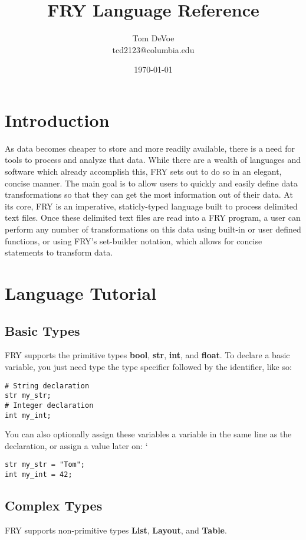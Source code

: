 \documentclass{article}
\title{FRY Language Reference}
\author{Tom DeVoe \\ tcd2123@columbia.edu}
\date{\today}
\begin{document}
\maketitle
\tableofcontents 

\section{Introduction}
As data becomes cheaper to store and more readily available, there is a need for tools to process and analyze that data. While there are a wealth of languages and software which already accomplish this, FRY sets out to do so in an elegant, concise manner. The main goal is to allow users to quickly and easily define data transformations so that they can get the most information out of their data.
At its core, FRY is an imperative, staticly-typed language built to process delimited text files. Once these delimited text files are read into a FRY program, a user can perform any number of transformations on this data using built-in or user defined functions, or using FRY's set-builder notation, which allows for concise statements to transform data. 

\section{Language Tutorial}
\subsection{Basic Types}
FRY supports the primitive types \textbf{bool}, \textbf{str}, \textbf{int}, and \textbf{float}. To declare a basic variable, you just need type the type specifier followed by the identifier, like so:

\begin{lstlisting}
# String declaration
str my_str;
# Integer declaration 
int my_int;
\end{lstlisting}

You can also optionally assign these variables a variable in the same line as the declaration, or assign a value later on:
`
\begin{lstlisting}
str my_str = "Tom";
int my_int = 42;
\end{lstlisting}

\subsection{Complex Types}
FRY supports non-primitive types \textbf{List}, \textbf{Layout}, and \textbf{Table}. 
\end{document}

